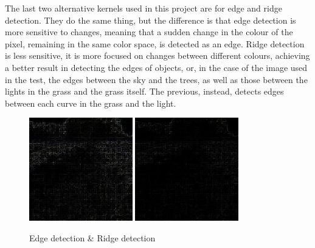     The last two alternative kernels used in this project are for edge and ridge detection.
    They do the same thing, but the difference is that edge detection is more sensitive to changes, meaning that a sudden change in the colour of the pixel, 
    remaining in the same color space, is detected as an edge. Ridge detection is less sensitive, it is more focused on changes between different colours, achieving 
    a better result in detecting the edges of objects, or, in the case of the image used in the test, the edges between the sky and the trees, as well as those 
    between the lights in the grass and the grass itself. The previous, instead, detects edges between each curve in the grass and the light.
    \begin{figure}[h]
        \centering
        \includegraphics[width=0.4\textwidth]{img/edgedet/final.jpg}
        \includegraphics[width=0.4\textwidth]{img/ridge/final.jpg}
        \caption{Edge detection \& Ridge detection}
        \label{fig:edge}
    \end{figure}

\clearpage